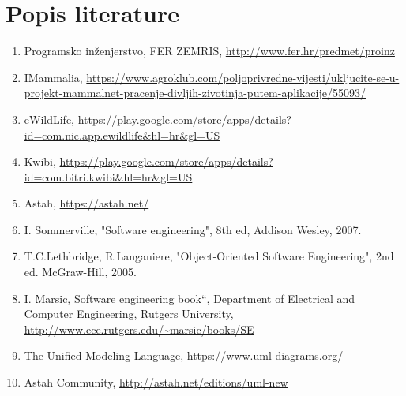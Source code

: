 \chapter*{Popis literature}
	 	
		
		
		\begin{enumerate}
			
			
			\item  Programsko inženjerstvo, FER ZEMRIS, \url{http://www.fer.hr/predmet/proinz}
			
			\item IMammalia, \url{https://www.agroklub.com/poljoprivredne-vijesti/ukljucite-se-u-projekt-mammalnet-pracenje-divljih-zivotinja-putem-aplikacije/55093/}
			
			\item eWildLife, \url{https://play.google.com/store/apps/details?id=com.nic.app.ewildlife&hl=hr&gl=US}
			
			\item Kwibi, \url{https://play.google.com/store/apps/details?id=com.bitri.kwibi&hl=hr&gl=US}
			
			\item Astah, \url{https://astah.net/}
			
			\item  I. Sommerville, "Software engineering", 8th ed, Addison Wesley, 2007.
			
			\item  T.C.Lethbridge, R.Langaniere, "Object-Oriented Software Engineering", 2nd ed. McGraw-Hill, 2005.
			
			\item  I. Marsic, Software engineering book``, Department of Electrical and Computer Engineering, Rutgers University, \url{http://www.ece.rutgers.edu/~marsic/books/SE}
			
			\item  The Unified Modeling Language, \url{https://www.uml-diagrams.org/}
			
			\item  Astah Community, \url{http://astah.net/editions/uml-new}
		\end{enumerate}
		
		 